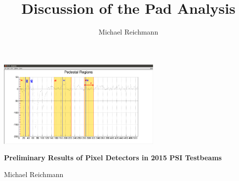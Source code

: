 \documentclass[9pt]{beamer}
\title[Analysis]{Discussion of the Pad Analysis}
\author[M. Reichmann]{Michael Reichmann}
\institute[\textbf{\textit{ETH}}\scalebox{.6}{\textit{Z\"{u}rich}}]{Swiss Federal Institute of Technology Zurich}
\begin{document}
\begin{frame}
	\begin{center}
		\includegraphics[width=8cm]{Pics/PedestalRegions}
	\end{center}
	\begin{alertblock}{
		\begin{center}
			\textbf{Preliminary Results of Pixel Detectors in 2015 PSI Testbeams}
		\end{center}}
		\vspace*{10pt}
		\begin{center}\small
		Michael Reichmann
		\end{center}\normalsize
	\end{alertblock}
\end{frame}
\end{document}
